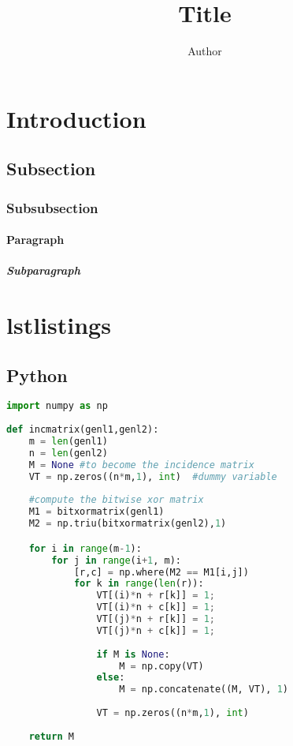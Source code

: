 \documentclass[10pt,titlepage]{article}
\title{Title}
\author{Author}
\begin{document}
\maketitle

\tableofcontents
\newpage

\section{Introduction}
\lipsum[1-1]

\subsection{Subsection}
\lipsum[2-3]

\subsubsection{Subsubsection}
\lipsum[2-3]

\paragraph{Paragraph}
\lipsum[1-2]

\subparagraph{Subparagraph}
\lipsum[1-2]

\section{lstlistings}

\subsection{Python}
\begin{lstlisting}[language=python]
import numpy as np
    
def incmatrix(genl1,genl2):
    m = len(genl1)
    n = len(genl2)
    M = None #to become the incidence matrix
    VT = np.zeros((n*m,1), int)  #dummy variable
    
    #compute the bitwise xor matrix
    M1 = bitxormatrix(genl1)
    M2 = np.triu(bitxormatrix(genl2),1) 

    for i in range(m-1):
        for j in range(i+1, m):
            [r,c] = np.where(M2 == M1[i,j])
            for k in range(len(r)):
                VT[(i)*n + r[k]] = 1;
                VT[(i)*n + c[k]] = 1;
                VT[(j)*n + r[k]] = 1;
                VT[(j)*n + c[k]] = 1;
                
                if M is None:
                    M = np.copy(VT)
                else:
                    M = np.concatenate((M, VT), 1)
                
                VT = np.zeros((n*m,1), int)
    
    return M
\end{lstlisting}
\end{document}
